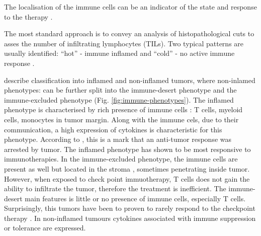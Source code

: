 \documentclass[12pt,]{book}
\theoremstyle{definition}
\theoremstyle{definition}
\theoremstyle{definition}
\theoremstyle{remark}
\begin{document}
The localisation of the immune cells can be an indicator of the state
and response to the therapy \citep{Bindea2013}.

The most standard approach is to convey an analysis of histopathological
cuts to asses the number of infiltrating lymphocytes (TILs). Two typical
patterns are usually identified: ``hot'' - immune inflamed and ``cold''
- no active immune response \citep{Berghoff2018}.

\citet{Chen2017} describe classification into inflamed and non-inflamed
tumors, where non-inlamed phenotypes: can be further split into the
immune-desert phenotype and the immune-excluded phenotype (Fig.
\ref{fig:immune-phenotypes}). The inflamed phenotype is characterised by
rich presence of immune cells : T cells, myeloid cells, monocytes in
tumor margin. Along with the immune cels, due to their communication, a
high expression of cytokines is characteristic for this phenotype.
According to \citet{Chen2017}, this is a mark that an anti-tumor
response was arrested by tumor. The inflamed phenotype has shown to be
most responsive to immunotherapies. In the immune-excluded phenotype,
the immune cells are present as well but located in the stroma
\citep{Herbst2014}, sometimes penetrating inside tumor. However, when
exposed to check point immuotherapy, T cells does not gain the ability
to infiltrate the tumor, therefore the treatment is inefficient. The
immune-desert main features is little or no presence of immune cells,
especially T cells. Surprisingly, this tumors have been to proven to
rarely respond to the checkpoint therapy \citep{Herbst2014}. In
non-inflamed tumours cytokines associated with immune suppression or
tolerance are expressed.
\end{document}
